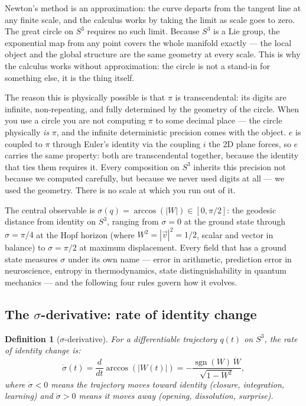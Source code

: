 \documentclass[12pt]{article}
\newtheorem{definition}[theorem]{Definition}
\begin{document}
Newton's method is an approximation: the curve departs from the tangent line at any finite scale, and the calculus works by taking the limit as scale goes to zero. The great circle on $S^3$ requires no such limit. Because $S^3$ is a Lie group, the exponential map from any point covers the whole manifold exactly --- the local object and the global structure are the same geometry at every scale. This is why the calculus works without approximation: the circle is not a stand-in for something else, it is the thing itself.

The reason this is physically possible is that $\pi$ is transcendental: its digits are infinite, non-repeating, and fully determined by the geometry of the circle. When you use a circle you are not computing $\pi$ to some decimal place --- the circle physically \emph{is} $\pi$, and the infinite deterministic precision comes with the object. $e$ is coupled to $\pi$ through Euler's identity via the coupling $i$ the 2D plane forces, so $e$ carries the same property: both are transcendental together, because the identity that ties them requires it. Every composition on $S^3$ inherits this precision not because we computed carefully, but because we never used digits at all --- we used the geometry. There is no scale at which you run out of it.

The central observable is $\sigma(q) = \arccos(|W|) \in [0, \pi/2]$: the geodesic distance from identity on $S^3$, ranging from $\sigma = 0$ at the ground state through $\sigma = \pi/4$ at the Hopf horizon (where $W^2 = |\vec{v}|^2 = 1/2$, scalar and vector in balance) to $\sigma = \pi/2$ at maximum displacement. Every field that has a ground state measures $\sigma$ under its own name --- error in arithmetic, prediction error in neuroscience, entropy in thermodynamics, state distinguishability in quantum mechanics --- and the following four rules govern how it evolves.

\subsection{The $\sigma$-derivative: rate of identity change}

\begin{definition}[$\sigma$-derivative]
    For a differentiable trajectory $q(t)$ on $S^3$, the rate of identity change is:
    \begin{equation}
        \dot{\sigma}(t) = \frac{d}{dt}\arccos(|W(t)|) = -\frac{\operatorname{sgn}(W)\,\dot{W}}{\sqrt{1 - W^2}},
    \end{equation}
    where $\dot{\sigma} < 0$ means the trajectory moves toward identity (closure, integration, learning) and $\dot{\sigma} > 0$ means it moves away (opening, dissolution, surprise).
\end{definition}
\end{document}
